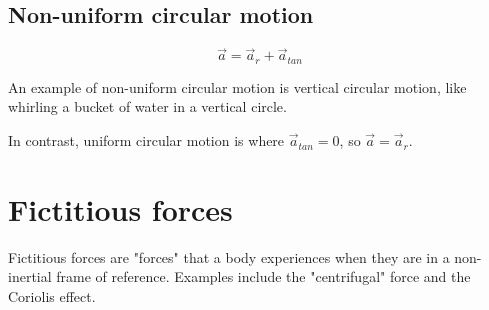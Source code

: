 \documentclass[11pt]{article}
\begin{document}
\subsection{Non-uniform circular motion}
\label{sec:orge9e2bba}
\[\vec{a} = \vec{a}_r + \vec{a}_{tan}\]

An example of non-uniform circular motion is vertical circular motion, like whirling a bucket of water in a vertical circle.


In contrast, uniform circular motion is where \(\vec{a}_{tan} = 0\), so \(\vec{a} = \vec{a}_r\).
\section{Fictitious forces}
\label{sec:org9c5d49f}
Fictitious forces are "forces" that a body experiences when they are in a non-inertial frame of reference. Examples include the "centrifugal" force and the Coriolis effect.
\end{document}
